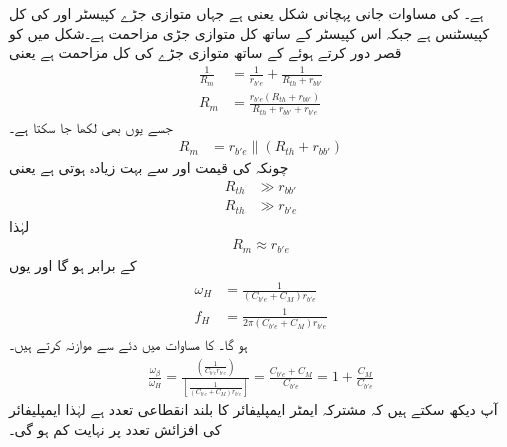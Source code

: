ہے۔ کی مساوات جانی پہچانی شکل یعنی  ہے جہاں  متوازی جڑے کپیسٹر  اور  کی کل کپیسٹنس  ہے جبکہ  اس کپیسٹر کے ساتھ کل متوازی جڑی مزاحمت ہے۔شکل  میں  کو قصر دور کرتے ہوئے  کے ساتھ متوازی جڑے   کی کل مزاحمت  ہے یعنی
\begin{align*}
\frac{1}{R_m}&=\frac{1}{r_{b'e}}+\frac{1}{R_{th}+r_{bb'}} \\
R_m&=\frac{ r_{b'e} \left(R_{th}+r_{bb'} \right)}{R_{th}+r_{bb'}+r_{b'e}}
\end{align*}
جسے یوں بھی لکھا جا سکتا ہے۔
\begin{align*}
R_m&= r_{b'e} \mathbin{\|}\left(R_{th}+r_{bb'} \right)
\end{align*}
چونکہ   کی قیمت  اور  سے بہت زیادہ ہوتی ہے یعنی
\begin{align*}
R_{th} & \gg r_{bb'}\\
R_{th} & \gg r_{b'e}
\end{align*}
لہٰذا
\begin{align*}
R_m \approx r_{b'e}
\end{align*}
کے برابر ہو گا اور یوں
\begin{gather}
\begin{aligned} \label{مساوات_تعددی_ردعمل_بلند_انقطاعی_تعدد}
\omega_H &= \frac{1}{\left(C_{b'e}+C_M \right) r_{b'e}} \\
f_H& = \frac{1}{2 \pi \left(C_{b'e}+C_M \right) r_{b'e}} 
\end{aligned}
\end{gather}
ہو گا۔ کا مساوات  میں دئے  سے موازنہ کرتے ہیں۔
\begin{align} \label{مساوات_تعددی_ردعمل_بلند_تعدد_شرح}
\frac{\omega_{\beta}}{\omega_H}=\frac{\left(\frac{1}{C_{b'e} r_{b'e}} \right)}{\left [\frac{1}{\left(C_{b'e}+C_M \right) r_{b'e}} \right]}=\frac{C_{b'e}+C_M}{C_{b'e}}=1+\frac{C_M}{C_{b'e}}
\end{align}
آپ دیکھ سکتے ہیں کہ مشترکہ ایمٹر       ایمپلیفائر کا بلند انقطاعی تعدد   ہے  لہٰذا ایمپلیفائر کی افزائش   تعدد پر نہایت کم ہو گی۔

